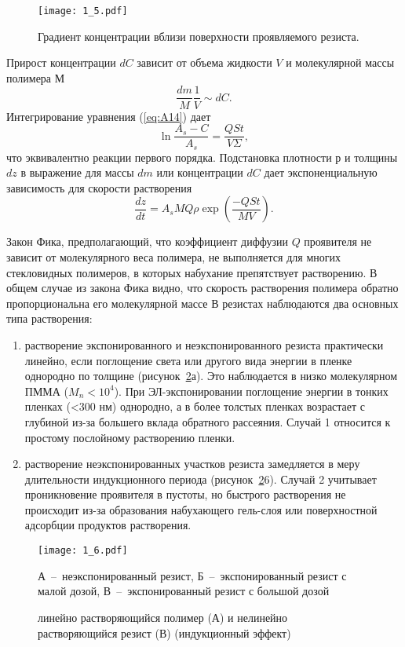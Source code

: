 \begin{figure}
\center
\texttt{[image: 1\_5.pdf]}
\caption{Градиент концентрации вблизи поверхности проявляемого резиста.}
\label{fig:5}
\end{figure}

Прирост концентрации $dC$ зависит от объема жидкости $V$ и молекулярной массы полимера $М$
\begin{equation}
\frac{dm}{M}\frac{1}{V} \sim dC.
\label{eq:A15}
\end{equation}
Интегрирование уравнения (\ref{eq:A14}) дает
\begin{equation}
\ln\frac{A_s-C}{A_s} = \frac{QSt}{V\Sigma},
\label{eq:A16}
\end{equation}
что эквивалентно реакции первого порядка. Подстановка плотности $р$ и толщины $dz$ в выражение для массы $dm$ или концентрации $dC$ дает экспоненциальную зависимость для скорости растворения
\begin{equation}
\frac{dz}{dt} = A_s MQ \rho\exp\left(\frac{-QSt}{MV}\right).
\label{eq:A17}
\end{equation}

Закон Фика, предполагающий, что коэффициент диффузии $Q$ проявителя не зависит от молекулярного веса полимера, не выполняется для многих стекловидных полимеров, в которых набухание препятствует растворению.
В общем случае из закона Фика видно, что скорость растворения полимера обратно пропорциональна его молекулярной массе В резистах наблюдаются два основных типа растворения:
\begin{enumerate}
    \item растворение экспонированного и неэкспонированного резиста практически линейно, если поглощение света или другого вида энергии в пленке однородно по толщине (рисунок~\ref{fig:6}а). Это наблюдается в низко молекулярном ПММА ($M_n<10^4$). При ЭЛ-экспонировании поглощение энергии в тонких пленках (<300 нм) однородно, а в более толстых пленках возрастает с глубиной из-за большего вклада обратного рассеяния. Случай 1 относится к простому послойному растворению пленки.
    \item растворение неэкспонированных участков резиста замедляется в меру длительности индукционного периода (рисунок~\ref{fig:6}6). Случай 2 учитывает проникновение проявителя в пустоты, но быстрого растворения не происходит из-за образования набухающего гель-слоя или поверхностной адсорбции продуктов растворения. 
\end{enumerate}
\begin{figure}[h]
\center
\texttt{[image: 1\_6.pdf]}
\parbox[t]{.7\textwidth}{\small
А~--~неэкспонированный резист, Б~--~экспонированный резист с малой дозой, В~--~экспонированный резист с большой дозой}
\caption{линейно растворяющийся полимер (А) и нелинейно растворяющийся резист (В) (индукционный эффект)}
\label{fig:6}
\end{figure}

